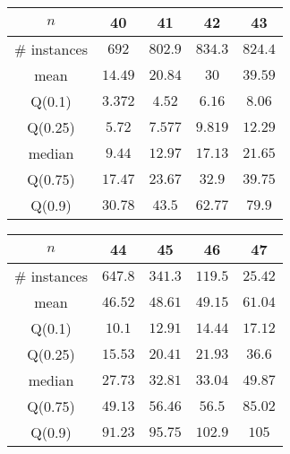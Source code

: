 \begin{tabular}{c|cccc} 
\hline 
$n$ & 40 & 41 & 42 & 43 \tabularnewline 
\hline 
\hline 
\# instances & $692$ & $802.9$ & $834.3$ & $824.4$ \tabularnewline 
mean & $14.49$ & $20.84$ & $30$ & $39.59$ \tabularnewline 
Q(0.1) & $3.372$ & $4.52$ & $6.16$ & $8.06$ \tabularnewline 
Q(0.25) & $5.72$ & $7.577$ & $9.819$ & $12.29$ \tabularnewline 
median & $9.44$ & $12.97$ & $17.13$ & $21.65$ \tabularnewline 
Q(0.75) & $17.47$ & $23.67$ & $32.9$ & $39.75$ \tabularnewline 
Q(0.9) & $30.78$ & $43.5$ & $62.77$ & $79.9$ \tabularnewline 
\hline 
\end{tabular} 
\medskip{} 

\begin{tabular}{c|cccc} 
\hline 
$n$ & 44 & 45 & 46 & 47 \tabularnewline 
\hline 
\hline 
\# instances & $647.8$ & $341.3$ & $119.5$ & $25.42$ \tabularnewline 
mean & $46.52$ & $48.61$ & $49.15$ & $61.04$ \tabularnewline 
Q(0.1) & $10.1$ & $12.91$ & $14.44$ & $17.12$ \tabularnewline 
Q(0.25) & $15.53$ & $20.41$ & $21.93$ & $36.6$ \tabularnewline 
median & $27.73$ & $32.81$ & $33.04$ & $49.87$ \tabularnewline 
Q(0.75) & $49.13$ & $56.46$ & $56.5$ & $85.02$ \tabularnewline 
Q(0.9) & $91.23$ & $95.75$ & $102.9$ & $105$ \tabularnewline 
\hline 
\end{tabular} 
\medskip{} 

